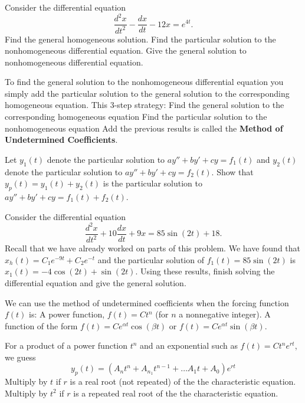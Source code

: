 \ii Consider the differential equation
\[ \frac{d^2x}{dt^2}-\frac{dx}{dt}-12x=e^{4t}.\]
\bb
\ii Find the general homogeneous solution. \vspace{2in}
\ii Find the particular solution to the nonhomogeneous differential equation. \vfill
\ii Give the general solution to nonhomogeneous differential equation.  \vspace{1in}
\ee
\ee

\clearpage
{}

To find the general solution to the nonhomogeneous differential equation you simply add the particular solution to the general solution to the corresponding homogeneous equation. This 3-step strategy:
\bi
\ii Find the general solution to the corresponding homogeneous equation
\ii Find the particular solution to the nonhomogeneous equation
\ii Add the previous results
\ei
is called the \textbf{Method of Undetermined Coefficients}.


\begin{enumerate}[resume]
\ii Let $y_1(t)$ denote the particular solution to $ay''+by'+cy=f_1(t)$ and $y_2(t)$ denote the particular solution to $ay''+by'+cy=f_2(t)$. Show that $y_p(t) = y_1(t) + y_2(t)$ is the particular solution to $ay''+by'+cy=f_1(t)+f_2(t)$. \vfill


\ii Consider the differential equation
\[ \frac{d^2x}{dt^2}+10\frac{dx}{dt}+9x=85\sin(2t)+18.\]
Recall that we have already worked on parts of this problem. We have found that $x_h (t) = C_1e^{-9t}+C_2e^{-t}$ and the particular solution of $f_1(t) = 85\sin(2t)$ is $x_{1}(t) = -4\cos{(2t)}+\sin{(2t)}$. Using these results, finish solving the differential equation and give the general solution. \vfill

\end{enumerate}

\clearpage


We can use the method of undetermined coefficients when the forcing function $f(t)$ is:
\bi
\ii A power function, $f(t) = Ct^n$ (for $n$ a nonnegative integer).
\ii A function of the form $f(t) = Ce^{\alpha t}\cos{(\beta t)}$ or $f(t) = Ce^{\alpha t}\sin{(\beta t)}$.
\ei

\bi
\ii For a product of a power function $t^n$ and an exponential such as $f(t) = Ct^ne^{rt}$, we guess
\[ y_p(t) = (A_n t^n + A_{n_1} t^{n-1} + \ldots A_1 t + A_0)e^{rt}\]
\bi
\ii Multiply by $t$ if $r$ is a real root  (not repeated) of the the characteristic equation.
\ii Multiply by $t^2$ if $r$ is a repeated real root of the the characteristic equation.
\ei \bs
\ei

